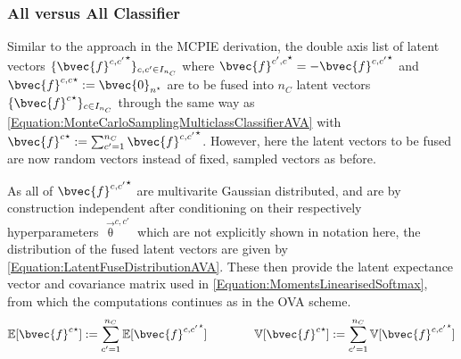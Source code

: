 			\subsubsection{All versus All Classifier}
			\label{InformativeSeafloorExploration:LMDE:Multiclass:AVA}
					
				Similar to the approach in the MCPIE derivation, the double axis list of latent vectors $\{ {\bvec{f}^{c, c'}}^{\star} \}_{c, c' \in I_{n_{C}}}$ where ${\bvec{f}^{c', c}}^{\star} = - {\bvec{f}^{c, c'}}^{\star}$ and ${\bvec{f}^{c, c}}^{\star} := \bvec{0}_{n^{\star}}$  are to be fused into $n_{C}$ latent vectors $\{ {\bvec{f}^{c}}^{\star} \}_{c \in I_{n_{C}}}$ through the same way as \eqref{Equation:MonteCarloSamplingMulticlassClassifierAVA} with ${\bvec{f}^{c}}^{\star} := \sum_{c' = 1}^{n_{C}} {\bvec{f}^{c, c'}}^{\star}$. However, here the latent vectors to be fused are now random vectors instead of fixed, sampled vectors as before. 
			
				As all of ${\bvec{f}^{c, c'}}^{\star}$ are multivarite Gaussian distributed, and are by construction independent after conditioning on their respectively hyperparameters $\vec{\uptheta}^{c, c'}$ which are not explicitly shown in notation here, the distribution of the fused latent vectors are given by \eqref{Equation:LatentFuseDistributionAVA}. These then provide the latent expectance vector and covariance matrix used in \eqref{Equation:MomentsLinearisedSoftmax}, from which the computations continues as in the OVA scheme. \begin{equation}
					\begin{aligned}
						\mathbb{E}[{\bvec{f}^{c}}^{\star}] := \sum_{c' = 1}^{n_{C}} \mathbb{E}[{\bvec{f}^{c, c'}}^{\star}] \qquad \qquad \mathbb{V}[{\bvec{f}^{c}}^{\star}] := \sum_{c' = 1}^{n_{C}} \mathbb{V}[{\bvec{f}^{c, c'}}^{\star}]
					\end{aligned}
				\label{Equation:LatentFuseDistributionAVA}
				\end{equation}
				

				
			
